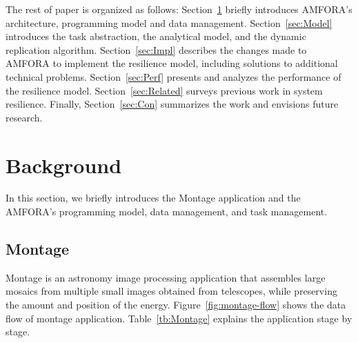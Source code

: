 \documentclass{sig-alternate}
\begin{document}
The rest of paper is organized as follows:
Section~\ref{sec:background} briefly introduces AMFORA's architecture, programming model and data management.
Section~\ref{sec:Model} introduces the task abstraction, the analytical model, and the dynamic replication algorithm. 
Section~\ref{sec:Impl} describes the changes made to AMFORA 
to implement the resilience model, including solutions to additional technical problems. 
Section~\ref{sec:Perf} presents and analyzes the performance of the resilience model.  
Section~\ref{sec:Related} surveys previous work in system resilience.
Finally, Section~\ref{sec:Con} summarizes the work and envisions future research.

\section{Background}
\label{sec:background}
In this section, we briefly introduces the Montage application and the AMFORA's programming model, data management, and task management.

\subsection{Montage}
Montage is an astronomy image processing application that assembles large mosaics from multiple small images obtained from telescopes, while preserving the amount and position of the energy. 
Figure~\ref{fig:montage-flow} shows the data flow of montage application.
Table~\ref{tb:Montage} explains the application stage by stage.
\end{document}
